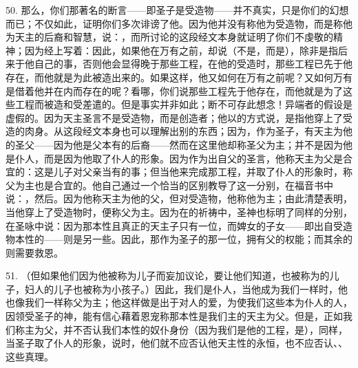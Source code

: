 50. 那么，你们那著名的断言——即圣子是受造物——并不真实，只是你们的幻想而已；不仅如此，证明你们多次诽谤了他。因为他并没有称他为受造物，而是称他为天主的后裔和智慧，说：，而所讨论的这段经文本身就证明了你们不虔敬的精神；因为经上写着：因此，如果他在万有之前，却说（不是，而是），除非是指后来于他自己的事，否则他会显得晚于那些工程，在他的受造时，那些工程已先于他存在，而他就是为此被造出来的。如果这样，他又如何在万有之前呢？又如何万有是借着他并在内而存在的呢？看哪，你们说那些工程先于他存在，而他就是为了这些工程而被造和受差遣的。但是事实并非如此；断不可存此想念！异端者的假设是虚假的。因为天主圣言不是受造物，而是创造者；他以的方式说，是指他穿上了受造的肉身。从这段经文本身也可以理解出别的东西；因为，作为圣子，有天主为他的圣父——因为他是父本有的后裔——然而在这里他却称圣父为主；并不是因为他是仆人，而是因为他取了仆人的形象。因为作为出自父的圣言，他称天主为父是合宜的：这是儿子对父亲当有的事；但当他来完成那工程，并取了仆人的形象时，称父为主也是合宜的。他自己通过一个恰当的区别教导了这一分别，在福音书中说：，然后。因为他称天主为他的父，但对受造物，他称他为主；由此清楚表明，当他穿上了受造物时，便称父为主。因为在的祈祷中，圣神也标明了同样的分别，在圣咏中说：因为那本性且真正的天主子只有一位，而婢女的子女——即出自受造物本性的——则是另一些。因此，那作为圣子的那一位，拥有父的权能；而其余的则需要救恩。\par

51. （但如果他们因为他被称为儿子而妄加议论，要让他们知道，也被称为的儿子，妇人的儿子也被称为小孩子。）因此，我们是仆人，当他成为我们一样时，他也像我们一样称父为主；他这样做是出于对人的爱，为使我们这些本为仆人的人，因领受圣子的神，能有信心藉着恩宠称那本性是我们主的天主为父。但是，正如我们称主为父，并不否认我们本性的奴仆身份（因为我们是他的工程，是），同样，当圣子取了仆人的形象，说时，他们就不应否认他天主性的永恒，也不应否认、、这些真理。\par



